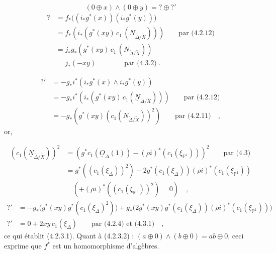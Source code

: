 \begin{equation*}
(0 \oplus x) \wedge (0 \oplus y) = ? \oplus ?'
\end{equation*}
\begin{equation*}
\begin{aligned}
? &= f_*\bigl((i_*g^*(x))(i_*g^*(y))\bigr) \\
&= f_*(i_*(g^*(xy)\, c_1\, (N_{\widetilde{\Delta}/\widetilde{X}}))) \qquad \text{par (4.2.12)} \\
&= j_*g_*(g^*(xy)\, c_1\, (N_{\widetilde{\Delta}/\widetilde{X}})) \\
&= j_*(-xy) \qquad\qquad \text{par (4.3.2)} \;.
\end{aligned}
\end{equation*}


\begin{equation*}
\begin{aligned}
?' &= -g_*i^*(i_*g^*(x) \wedge i_*g^*(y)) \\
&= -g_*i^*(i_*(g^*(xy)\, c_1(\underline{N}_{\widetilde{\Delta}/\widetilde{X}}))) \qquad \text{par (4.2.12)} \\
&= -g_*(g^*(xy)(c_1(N_{\widetilde{\Delta}/\widetilde{X}}))^2) \qquad \text{par (4.2.11)} \quad ,
\end{aligned}
\end{equation*}
or,

\begin{equation*}
\begin{aligned}
(c_1(\underline{N}_{\widetilde{\Delta}/\widetilde{X}}))^2 &= (g^*c_1(\underline{O}_{\Delta}(1)) - (\rho i)^* (c_1(\xi_{\mathbb{P}^1})))^2 \qquad \text{par (4.3)} \\
&= g^*((c_1(\xi_\Delta))^2) - 2g^*(c_1(\xi_\Delta))(\rho i)^*(c_1(\xi_{\mathbb{P}^1})) \\
&\quad ( + (\rho i)^* ((c_1( \xi_{\mathbb{P}^1}))^2) = 0 ) \quad ,
\end{aligned}
\end{equation*}
\begin{equation*}
\begin{aligned}
?' &= - g_*\bigl(g^*(xy)g^*(c_1(\xi_\Delta)^2)\bigr)
      + g_*\bigl(2g^*(xy)g^*(c_1(\xi_\Delta))(\rho i)^*(c_1(\xi_{\mathbb{P}^1}))\bigr) \\
?' &= 0 + 2xy\, c_1(\xi_\Delta) \qquad \text{par (4.2.4) et (4.3.1)} \quad ,
\end{aligned}
\end{equation*}
ce qui établit (4.2.3.1). Quant à (4.2.3.2) : $(a \oplus 0) \wedge (b \oplus 0) = ab \oplus 0$, ceci exprime que $f^*$ est un homomorphisme d'algèbres.

